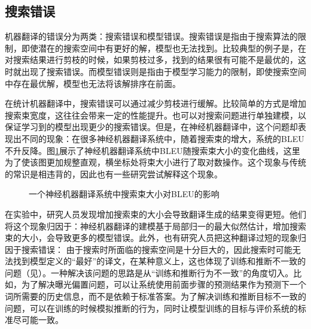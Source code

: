 
\subsection{搜索错误}

\parinterval 机器翻译的错误分为两类：搜索错误和模型错误。搜索错误是指由于搜索算法的限制，即使潜在的搜索空间中有更好的解，模型也无法找到。比较典型的例子是，在对搜索结果进行剪枝的时候，如果剪枝过多，找到的结果很有可能不是最优的，这时就出现了搜索错误。而模型错误则是指由于模型学习能力的限制，即使搜索空间中存在最优解，模型也无法将该解排序在前面。

\parinterval 在统计机器翻译中，搜索错误可以通过减少剪枝进行缓解。比较简单的方式是增加搜索束宽度，这往往会带来一定的性能提升。也可以对搜索问题进行单独建模，以保证学习到的模型出现更少的搜索错误。但是，在神经机器翻译中，这个问题却表现出不同的现象：在很多神经机器翻译系统中，随着搜索束的增大，系统的BLEU不升反降。图\ref{fig:14-3}展示了神经机器翻译系统中BLEU随搜索束大小的变化曲线，这里为了使该图更加规整直观，横坐标处将束大小进行了取对数操作。这个现象与传统的常识是相违背的，因此也有一些研究尝试解释这个现象。

\begin{figure}[htp]
\centering
 
\caption{一个神经机器翻译系统中搜索束大小对BLEU的影响}
\label{fig:14-3}
\end{figure}
\parinterval 在实验中，研究人员发现增加搜索束的大小会导致翻译生成的结果变得更短。他们将这个现象归因于：神经机器翻译的建模基于局部归一的最大似然估计，增加搜索束的大小，会导致更多的模型错误。此外，也有研究人员把这种翻译过短的现象归因于搜索错误： 由于搜索时所面临的搜索空间是十分巨大的，因此搜索时可能无法找到模型定义的“最好”的译文，在某种意义上，这也体现了训练和推断不一致的问题（见{\chapterthirteen}）。一种解决该问题的思路是从“训练和推断行为不一致”的角度切入。比如，为了解决曝光偏置问题，可以让系统使用前面步骤的预测结果作为预测下一个词所需要的历史信息，而不是依赖于标准答案。为了解决训练和推断目标不一致的问题，可以在训练的时候模拟推断的行为，同时让模型训练的目标与评价系统的标准尽可能一致。

